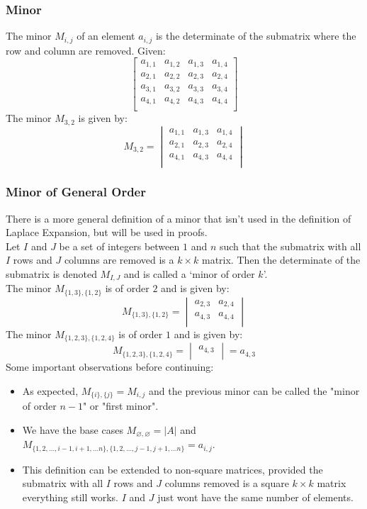 \subsubsection{Minor}
The minor $M_{i,j}$ of an element $a_{i,j}$ is the determinate of the submatrix where the row and column are removed.
Given:
\[\begin{bmatrix}
	a_{1,1}&a_{1,2}&a_{1,3}&a_{1,4} \\
	a_{2,1}&a_{2,2}&a_{2,3}&a_{2,4} \\
	a_{3,1}&a_{3,2}&a_{3,3}&a_{3,4} \\
	a_{4,1}&a_{4,2}&a_{4,3}&a_{4,4} \\
\end{bmatrix}\]
The minor $M_{3,2}$ is given by:
\[M_{3,2} = \begin{vmatrix}
	a_{1,1}&a_{1,3}&a_{1,4} \\
	a_{2,1}&a_{2,3}&a_{2,4} \\
	a_{4,1}&a_{4,3}&a_{4,4} \\
\end{vmatrix}\]

\subsubsection{Minor of General Order}
There is a more general definition of a minor that isn't used in the definition of Laplace Expansion,
but will be used in proofs.
\\

Let $I$ and $J$ be a set of integers between $1$ and $n$ such that the submatrix with all $I$ rows and $J$ columns are removed is a $k\times k$ matrix.
Then the determinate of the submatrix is denoted $M_{I,J}$ and is called a `minor of order $k$'.
\\


The minor $M_{\{1,3\},\{1,2\}}$ is of order $2$ and is given by:
\[M_{\{1,3\},\{1,2\}} = \begin{vmatrix}
	a_{2,3}&a_{2,4} \\
	a_{4,3}&a_{4,4} \\
\end{vmatrix}\]
The minor $M_{\{1,2,3\},\{1,2,4\}}$ is of order $1$ and is given by:
\[M_{\{1,2,3\},\{1,2,4\}} = \begin{vmatrix}
	a_{4,3} \\
\end{vmatrix} = a_{4,3}\]
Some important observations before continuing:
\begin{itemize}
	\item As expected, $M_{\{i\},\{j\}} = M_{i,j}$ and the previous minor can be called the "minor of order $n-1$" or "first minor".
	\item We have the base cases $M_{\varnothing,\varnothing} = |A|$ and $M_{\{1,2,\ldots,i-1,i+1,\ldots n\},\{1,2,\ldots,j-1,j+1,\ldots n\}} = a_{i,j}$.
	\item This definition can be extended to non-square matrices, provided the submatrix with all $I$ rows and $J$ columns removed is a square $k\times k$ matrix everything still works.
		$I$ and $J$ just wont have the same number of elements.
\end{itemize}

